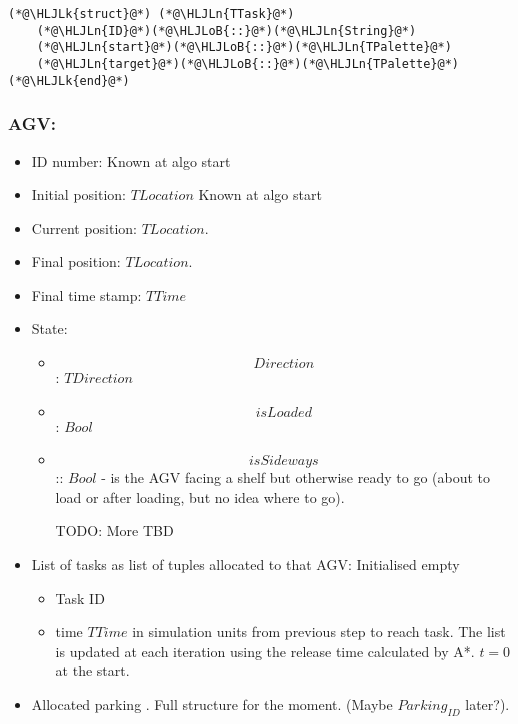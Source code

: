\documentclass[12pt,a4paper]{article}
\newcommand{\HLJLk}[1]{\textcolor[RGB]{148,91,176}{\textbf{#1}}}
\newcommand{\HLJLn}[1]{#1}
\newcommand{\HLJLoB}[1]{\textcolor[RGB]{102,102,102}{\textbf{#1}}}
\begin{document}
\begin{lstlisting}
(*@\HLJLk{struct}@*) (*@\HLJLn{TTask}@*)
    (*@\HLJLn{ID}@*)(*@\HLJLoB{::}@*)(*@\HLJLn{String}@*)
    (*@\HLJLn{start}@*)(*@\HLJLoB{::}@*)(*@\HLJLn{TPalette}@*)
    (*@\HLJLn{target}@*)(*@\HLJLoB{::}@*)(*@\HLJLn{TPalette}@*)
(*@\HLJLk{end}@*)
\end{lstlisting}


\subsubsection{AGV:}
\begin{itemize}
\item ID number: Known at algo start


\item Initial position: $TLocation$ Known at algo start


\item Current position: $TLocation$.


\item Final position: $TLocation$.


\item Final time stamp: $TTime$


\item State:

\begin{itemize}
\item \[
Direction
\]
: $TDirection$


\item \[
isLoaded
\]
: $Bool$


\item \[
isSideways
\]
:: $Bool$ - is the AGV facing a shelf but otherwise ready to go (about to load or after loading, but no idea where to go).


\item [TODO: More TBD]

\end{itemize}

\item List of tasks as list of tuples allocated to that AGV: Initialised empty

\begin{itemize}
\item Task ID


\item time $TTime$ in simulation units from previous step to reach task. The list is updated at each iteration using the release time calculated by A*. $t = 0$ at the start.

\end{itemize}

\item Allocated parking . Full structure for the moment. (Maybe $Parking_{ID}$ later?).

\end{itemize}
\end{document}

